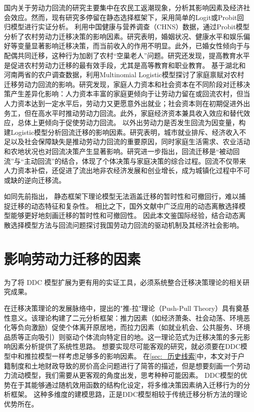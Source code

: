 \documentclass[a4paper,12pt,oneside, fontset=mac]{ctexbook} %
\begin{document}
国内关于劳动力回流的研究主要集中在农民工返潮现象，分析其影响因素及经济社会效应。然而，现有研究多停留在静态选择框架下，采用简单的Logit或Probit回归模型进行实证分析。
\cite{WangZhiQiangZhongGuoNongCunLaoDongLiQianYiYingXiangYinSuYanJiuJiYuProbitMoXingDeShiZhengFenXi2011}利用中国健康与营养调查（CHNS）数据，通过Probit模型分析了农村劳动力迁移决策的影响因素。研究表明，婚姻状况、健康水平和娱乐偏好等变量显著影响迁移决策，而当前收入的作用不明显。此外，已婚女性倾向于与配偶共同迁移，这种行为加剧了农村“空巢老人”问题。研究还发现，提高教育水平是促进农村劳动力迁移的最有效手段，尤其是高等教育和职业教育。
\cite{ShiZhiLeiJiaTingBingFuJiaTingJueCeYuNongCunQianYiLaoDongLiHuiLiu2012}基于湖北和河南两省的农户调查数据，利用Multinomial Logistic模型探讨了家庭禀赋对农村迁移劳动力回流的影响。研究发现，家庭人力资本和社会资本在不同阶段对迁移决策产生差异化影响：人力资本丰富的家庭更倾向于让劳动力留在或回流农村，但当人力资本达到一定水平后，劳动力又更愿意外出就业；社会资本则在初期促进外出务工，但在高水平时推动劳动力回流。此外，家庭经济资本兼具收入效应和替代效应，总体上更倾向于促使劳动力回流。
\cite{RenYuanNongCunWaiChuLaoDongLiHuiLiuQianYiDeYingXiangYinSuHeHuiLiuXiaoYing2017}以外出劳动力是否发生回流为因变量，构建Logistic模型分析回流迁移的影响因素。研究表明，城市就业排斥、经济收入不足以及社会保障缺失是推动劳动力回流的重要原因，同时家庭生活需求、农业活动和农地状况也对回流决策产生显著影响。研究进一步指出，回流迁移是“被动回流”与“主动回流”的结合，体现了个体决策与家庭决策的综合过程。回流不仅带来人力资本补偿，还促进了流出地非农经济发展和创业增长，成为城镇化过程中不可或缺的逆向迁移流。


如同先前指出，
静态框架下理论模型无法涵盖迁移的暂时性和可撤回行，难以捕捉迁移的动态特征和复杂性。
相比之下，国外文献中广泛应用的动态离散选择模型能够更好地刻画迁移的暂时性和可撤回性。
因此本文鉴国际经验，结合动态离散选择模型方法与回流问题探讨我国劳动力回流的驱动机制及其经济社会影响。

\section{影响劳动力迁移的因素}
\label{sec:_影响劳动力迁移的因素}

为了将 DDC 模型扩展为更有用的实证工具，必须系统整合迁移决策理论的相关研究成果。

在迁移决策理论的发展脉络中，\cite{leeTheoryMigration1966}提出的"推-拉"理论（Push-Pull Theory）具有奠基性意义。该理论构建了二元分析框架：推力因素（如经济萧条、社会动荡、环境恶化等负向激励）促使个体离开原居地，而拉力因素（如就业机会、公共服务、环境品质等正向吸引）则驱动个体流向特定目的地。这一理论范式为迁移决策的多元影响因素分析提供了系统性思路。
想要实现尽可能客观的研究，就必须要在DDC模型中和推拉模型一样考虑足够多的影响因素。
在\ref{sec:_历史线索}中，本文对于户籍制度和土地财政导致的房价高企问题进行了简答的描述，但是想要刻画一个劳动力流动模型，我们需要从更客观的角度出发，思考种种可能因素。
DDC模型的优势在于其能够通过随机效用函数的结构化设定，将多维决策因素纳入迁移行为的分析框架。
这种多维度的建模思路，正是DDC模型相较于传统迁移分析方法的理论优势所在。
\end{document}
